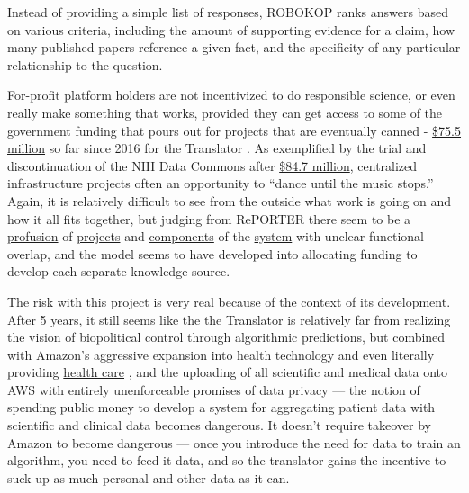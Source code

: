 \documentclass[10pt]{article}
\begin{document}
\begin{multicols}{2}
\begin{leftbar}
Instead of providing a simple list of responses, ROBOKOP ranks answers
based on various criteria, including the amount of supporting evidence
for a claim, how many published papers reference a given fact, and the
specificity of any particular relationship to the question.
\end{leftbar}

For-profit platform holders are not incentivized to do responsible
science, or even really make something that works, provided they can get
access to some of the government funding that pours out for projects
that are eventually canned -
\href{https://reporter.nih.gov/search/kDJ97zGUFEaIBIltUmyd_Q/projects?sort_field=FiscalYear\&sort_order=desc}{\$75.5
million} so far since 2016 for the Translator \cite{RePORTRePORTERBiomedical2021} . As exemplified by the trial and
discontinuation of the NIH Data Commons after
\href{https://reporter.nih.gov/search/H4LxgMGK9kGw6SeWCom85Q/projects?shared=true}{\$84.7
million}, centralized infrastructure projects often an opportunity to
``dance until the music stops.'' Again, it is relatively difficult to
see from the outside what work is going on and how it all fits together,
but judging from RePORTER there seem to be a
\href{https://reporter.nih.gov/project-details/10332268}{profusion} of
\href{https://reporter.nih.gov/project-details/10333468}{projects} and
\href{https://reporter.nih.gov/project-details/10333460}{components} of
the \href{https://reporter.nih.gov/project-details/10330627}{system}
with unclear functional overlap, and the model seems to have developed
into allocating funding to develop each separate knowledge source.

The risk with this project is very real because of the context of its
development. After 5 years, it still seems like the the Translator is
relatively far from realizing the vision of biopolitical control through
algorithmic predictions, but combined with Amazon's aggressive expansion
into health technology \cite{AWSAnnouncesAWS2021}  and even
literally providing \href{https://amazon.care/}{health care} \cite{lermanAmazonBuiltIts2021} , and the uploading of all scientific and
medical data onto AWS with entirely unenforceable promises of data
privacy --- the notion of spending public money to develop a system for
aggregating patient data with scientific and clinical data becomes
dangerous. It doesn't require takeover by Amazon to become dangerous ---
once you introduce the need for data to train an algorithm, you need to
feed it data, and so the translator gains the incentive to suck up as
much personal and other data as it can.


\end{multicols}
\end{document}
